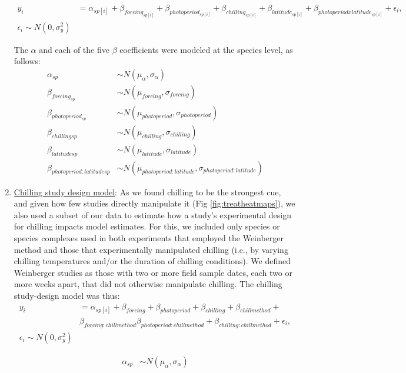 \documentclass{article}
\begin{document}
\begin{enumerate}
\begin{align*}
y_i &= \alpha_{sp[i]} + \beta_{forcing_{sp[i]}} + \beta_{photoperiod_{sp[i]}} + \beta_{chilling_{sp[i]}} + \beta_{latitude_{sp[i]}} + \beta_{photoperiod x latitude_{sp[i]}} + \epsilon{_i},\\
\epsilon_i \sim N(0,\sigma^2_y)
\end{align*}

\noindent The $\alpha$ and each of the five $\beta$ coefficients were modeled at the species level, as follows:
\begin{align*}
\alpha_{sp} &  \sim N(\mu_{\alpha}, \sigma_{\alpha}) \\
\beta_{forcing_{sp}} & \sim N(\mu_{forcing}, \sigma_{forcing}) \\
\beta_{photoperiod_{sp}} & \sim N(\mu_{photoperiod}, \sigma_{photoperiod})\\
\beta_{chilling{sp}} & \sim N(\mu_{chilling}, \sigma_{chilling})\\
\beta_{latitude{sp}} & \sim N(\mu_{latitude}, \sigma_{latitude})\\
\beta_{photoperiod : latitude{sp}} & \sim N(\mu_{photoperiod : latitude}, \sigma_{photoperiod : latitude})
\end{align*}


\item \underline{Chilling study design model}:
As we found chilling to be the strongest cue, and given how few studies directly manipulate it (Fig \ref{fig:treatheatmaps}), we also used a subset of our data to estimate how a study's experimental design for chilling impacts model estimates. For this, we included only species or species complexes used in both experiments that employed the Weinberger method \citep[in this method plant tissue is sequentially removed from the field and then exposed to `forcing' conditions, with the assumption that tissues collected later experience more field chilling][]{weinberger1950} and those that experimentally manipulated chilling (i.e., by varying chilling temperatures and/or the duration of chilling conditions). We defined Weinberger studies as those with two or more field sample dates, each two or more weeks apart, that did not otherwise manipulate chilling. The chilling study-design model was thus:
\begin{align*}
y_i &= \alpha_{sp[i]} + \beta_{forcing} + \beta_{photoperiod} + \beta_{chilling}+ \beta_{chillmethod} + \\ & \beta_{forcing:chillmethod} \beta_{photoperiod:chillmethod}+ \beta_{chilling:chillmethod} + \epsilon_{i},\\
\epsilon_{i} \sim N(0,\sigma^2_y)
\end{align*}

\begin{align*}
\alpha_{sp} & \sim N(\mu_{\alpha}, \sigma_{\alpha}) \\
\end{align*}

\end{enumerate}
\end{document}
